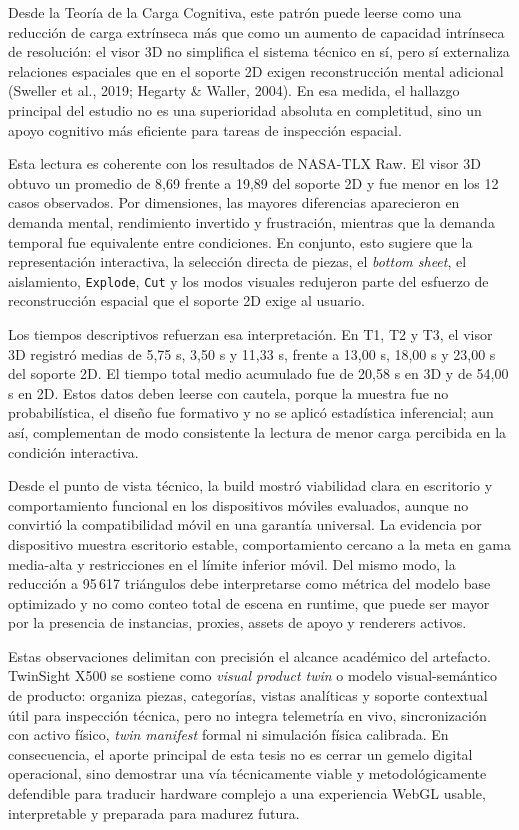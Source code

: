 Desde la Teoría de la Carga Cognitiva, este patrón puede leerse como una reducción de carga extrínseca más que como un aumento de capacidad intrínseca de resolución: el visor 3D no simplifica el sistema técnico en sí, pero sí externaliza relaciones espaciales que en el soporte 2D exigen reconstrucción mental adicional (Sweller et al., 2019; Hegarty \& Waller, 2004). En esa medida, el hallazgo principal del estudio no es una superioridad absoluta en completitud, sino un apoyo cognitivo más eficiente para tareas de inspección espacial.

Esta lectura es coherente con los resultados de NASA-TLX Raw. El visor 3D obtuvo un promedio de 8,69 frente a 19,89 del soporte 2D y fue menor en los 12 casos observados. Por dimensiones, las mayores diferencias aparecieron en demanda mental, rendimiento invertido y frustración, mientras que la demanda temporal fue equivalente entre condiciones. En conjunto, esto sugiere que la representación interactiva, la selección directa de piezas, el \textit{bottom sheet}, el aislamiento, \texttt{Explode}, \texttt{Cut} y los modos visuales redujeron parte del esfuerzo de reconstrucción espacial que el soporte 2D exige al usuario.

Los tiempos descriptivos refuerzan esa interpretación. En T1, T2 y T3, el visor 3D registró medias de 5,75 s, 3,50 s y 11,33 s, frente a 13,00 s, 18,00 s y 23,00 s del soporte 2D. El tiempo total medio acumulado fue de 20,58 s en 3D y de 54,00 s en 2D. Estos datos deben leerse con cautela, porque la muestra fue no probabilística, el diseño fue formativo y no se aplicó estadística inferencial; aun así, complementan de modo consistente la lectura de menor carga percibida en la condición interactiva.

Desde el punto de vista técnico, la build mostró viabilidad clara en escritorio y comportamiento funcional en los dispositivos móviles evaluados, aunque no convirtió la compatibilidad móvil en una garantía universal. La evidencia por dispositivo muestra escritorio estable, comportamiento cercano a la meta en gama media-alta y restricciones en el límite inferior móvil. Del mismo modo, la reducción a 95\,617 triángulos debe interpretarse como métrica del modelo base optimizado y no como conteo total de escena en runtime, que puede ser mayor por la presencia de instancias, proxies, assets de apoyo y renderers activos.

Estas observaciones delimitan con precisión el alcance académico del artefacto. TwinSight X500 se sostiene como \textit{visual product twin} o modelo visual-semántico de producto: organiza piezas, categorías, vistas analíticas y soporte contextual útil para inspección técnica, pero no integra telemetría en vivo, sincronización con activo físico, \textit{twin manifest} formal ni simulación física calibrada. En consecuencia, el aporte principal de esta tesis no es cerrar un gemelo digital operacional, sino demostrar una vía técnicamente viable y metodológicamente defendible para traducir hardware complejo a una experiencia WebGL usable, interpretable y preparada para madurez futura.
